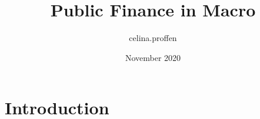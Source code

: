 \documentclass{article}
\title{Public Finance in Macro}
\author{celina.proffen }
\date{November 2020}
\begin{document}
\maketitle

\section{Introduction}
\end{document}
